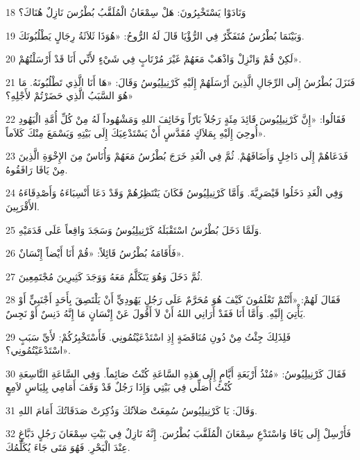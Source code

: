 \par 18 وَنَادَوْا يَسْتَخْبِرُونَ: هَلْ سِمْعَانُ الْمُلَقَّبُ بُطْرُسَ نَازِلٌ هُنَاكَ؟
\par 19 وَبَيْنَمَا بُطْرُسُ مُتَفَكِّرٌ فِي الرُّؤْيَا قَالَ لَهُ الرُّوحُ: «هُوَذَا ثَلاَثَةُ رِجَالٍ يَطْلُبُونَكَ.
\par 20 لَكِنْ قُمْ وَانْزِلْ وَاذْهَبْ مَعَهُمْ غَيْرَ مُرْتَابٍ فِي شَيْءٍ لأَنِّي أَنَا قَدْ أَرْسَلْتُهُمْ».
\par 21 فَنَزَلَ بُطْرُسُ إِلَى الرِّجَالِ الَّذِينَ أَرْسَلَهُمْ إِلَيْهِ كَرْنِيلِيُوسُ وَقَالَ: «هَا أَنَا الَّذِي تَطْلُبُونَهُ. مَا هُوَ السَّبَبُ الَّذِي حَضَرْتُمْ لأَجْلِهِ؟»
\par 22 فَقَالُوا: «إِنَّ كَرْنِيلِيُوسَ قَائِدَ مِئَةٍ رَجُلاً بَارّاً وَخَائِفَ اللهِ وَمَشْهُوداً لَهُ مِنْ كُلِّ أُمَّةِ الْيَهُودِ أُوحِيَ إِلَيْهِ بِمَلاَكٍ مُقَدَّسٍ أَنْ يَسْتَدْعِيَكَ إِلَى بَيْتِهِ وَيَسْمَعَ مِنْكَ كَلاَماً».
\par 23 فَدَعَاهُمْ إِلَى دَاخِلٍ وَأَضَافَهُمْ. ثُمَّ فِي الْغَدِ خَرَجَ بُطْرُسُ مَعَهُمْ وَأُنَاسٌ مِنَ الإِخْوَةِ الَّذِينَ مِنْ يَافَا رَافَقُوهُ.
\par 24 وَفِي الْغَدِ دَخَلُوا قَيْصَرِيَّةَ. وَأَمَّا كَرْنِيلِيُوسُ فَكَانَ يَنْتَظِرُهُمْ وَقَدْ دَعَا أَنْسِبَاءَهُ وَأَصْدِقَاءَهُ الأَقْرَبِينَ.
\par 25 وَلَمَّا دَخَلَ بُطْرُسُ اسْتَقْبَلَهُ كَرْنِيلِيُوسُ وَسَجَدَ وَاقِعاً عَلَى قَدَمَيْهِ.
\par 26 فَأَقَامَهُ بُطْرُسُ قَائِلاً: «قُمْ أَنَا أَيْضاً إِنْسَانٌ».
\par 27 ثُمَّ دَخَلَ وَهُوَ يَتَكَلَّمُ مَعَهُ وَوَجَدَ كَثِيرِينَ مُجْتَمِعِينَ.
\par 28 فَقَالَ لَهُمْ: «أَنْتُمْ تَعْلَمُونَ كَيْفَ هُوَ مُحَرَّمٌ عَلَى رَجُلٍ يَهُودِيٍّ أَنْ يَلْتَصِقَ بِأَحَدٍ أَجْنَبِيٍّ أَوْ يَأْتِيَ إِلَيْهِ. وَأَمَّا أَنَا فَقَدْ أَرَانِي اللهُ أَنْ لاَ أَقُولَ عَنْ إِنْسَانٍ مَا إِنَّهُ دَنِسٌ أَوْ نَجِسٌ.
\par 29 فَلِذَلِكَ جِئْتُ مِنْ دُونِ مُنَاقَضَةٍ إِذِ اسْتَدْعَيْتُمُونِي. فَأَسْتَخْبِرُكُمْ: لأَيِّ سَبَبٍ اسْتَدْعَيْتُمُونِي؟».
\par 30 فَقَالَ كَرْنِيلِيُوسُ: «مُنْذُ أَرْبَعَةِ أَيَّامٍ إِلَى هَذِهِ السَّاعَةِ كُنْتُ صَائِماً. وَفِي السَّاعَةِ التَّاسِعَةِ كُنْتُ أُصَلِّي فِي بَيْتِي وَإِذَا رَجُلٌ قَدْ وَقَفَ أَمَامِي بِلِبَاسٍ لاَمِعٍ
\par 31 وَقَالَ: يَا كَرْنِيلِيُوسُ سُمِعَتْ صَلاَتُكَ وَذُكِرَتْ صَدَقَاتُكَ أَمَامَ اللهِ.
\par 32 فَأَرْسِلْ إِلَى يَافَا وَاسْتَدْعِ سِمْعَانَ الْمُلَقَّبَ بُطْرُسَ. إِنَّهُ نَازِلٌ فِي بَيْتِ سِمْعَانَ رَجُلٍ دَبَّاغٍ عِنْدَ الْبَحْرِ. فَهُوَ مَتَى جَاءَ يُكَلِّمُكَ.
